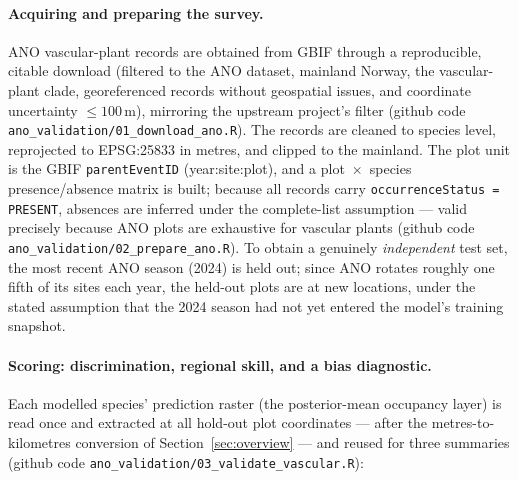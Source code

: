 \paragraph{Acquiring and preparing the survey.}
ANO vascular-plant records are obtained from GBIF through a reproducible,
citable download (filtered to the ANO dataset, mainland Norway, the
vascular-plant clade, georeferenced records without geospatial issues, and
coordinate uncertainty $\le 100$\,m), mirroring the upstream project's
filter (github code \texttt{ano\_validation/01\_download\_ano.R}). The
records are cleaned to species level, reprojected to EPSG:25833 in metres,
and clipped to the mainland. The plot unit is the GBIF \texttt{parentEventID}
(year:site:plot), and a plot~$\times$~species presence/absence matrix is
built; because all records carry \texttt{occurrenceStatus = PRESENT},
absences are inferred under the complete-list assumption --- valid precisely
because ANO plots are exhaustive for vascular plants (github code
\texttt{ano\_validation/02\_prepare\_ano.R}). To obtain a genuinely
\emph{independent} test set, the most recent ANO season (2024) is held out;
since ANO rotates roughly one fifth of its sites each year, the held-out
plots are at new locations, under the stated assumption that the 2024 season
had not yet entered the model's training snapshot.

\paragraph{Scoring: discrimination, regional skill, and a bias diagnostic.}
Each modelled species' prediction raster (the posterior-mean occupancy
layer) is read once and extracted at all hold-out plot coordinates --- after
the metres-to-kilometres conversion of Section~\ref{sec:overview} --- and
reused for three summaries (github code
\texttt{ano\_validation/03\_validate\_vascular.R}):

